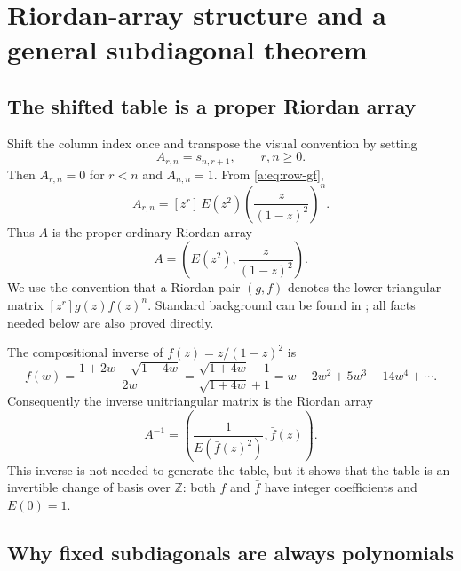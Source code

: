 \documentclass[11pt,a4paper,oneside,openany]{book}
\numberwithin{equation}{chapter}
\theoremstyle{definition}
\theoremstyle{remark}
\newcommand{\Z}{\mathbb Z}
\newcommand{\TM}{E}
\newcommand{\coeff}[2]{[z^{#1}]\,#2}
\begin{document}
\chapter{Riordan-array structure and a general subdiagonal theorem}
\label{b:sec:riordan}\label{ch:riordan}

\section{The shifted table is a proper Riordan array}

Shift the column index once and transpose the visual convention by setting
\begin{equation}
 A_{r,n}=s_{n,r+1},
 \qquad r,n\ge0.
 \label{b:eq:A-definition}
\end{equation}
Then $A_{r,n}=0$ for $r<n$ and $A_{n,n}=1$.  From
\eqref{a:eq:row-gf},
\begin{equation}
 A_{r,n}
 =\coeff{r}{\TM(z^2)\left(\frac{z}{(1-z)^2}\right)^n}.
 \label{b:eq:riordan-entry}
\end{equation}
Thus $A$ is the proper ordinary Riordan array
\begin{equation}
 A=\left(\TM(z^2),\frac{z}{(1-z)^2}\right).
 \label{b:eq:riordan-pair}
\end{equation}
We use the convention that a Riordan pair $(g,f)$ denotes the lower-triangular
matrix $[z^r]g(z)f(z)^n$.  Standard background can be found in
\cite{shapiro,sprugnoli}; all facts needed below are also proved
directly.

The compositional inverse of
$f(z)=z/(1-z)^2$ is
\begin{equation}
 \bar f(w)
 =\frac{1+2w-\sqrt{1+4w}}{2w}
 =\frac{\sqrt{1+4w}-1}{\sqrt{1+4w}+1}
 =w-2w^2+5w^3-14w^4+\cdots.
 \label{b:eq:f-inverse}
\end{equation}
Consequently the inverse unitriangular matrix is the Riordan array
\begin{equation}
 A^{-1}
 =\left(\frac{1}{\TM(\bar f(z)^2)},\bar f(z)\right).
 \label{b:eq:riordan-inverse}
\end{equation}
This inverse is not needed to generate the table, but it shows that the table
is an invertible change of basis over $\Z$: both $f$ and $\bar f$ have
integer coefficients and $\TM(0)=1$.

\section{Why fixed subdiagonals are always polynomials}
\end{document}
